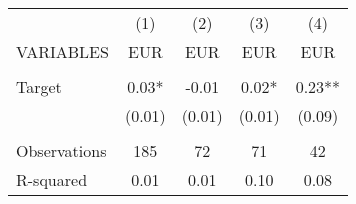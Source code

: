 \begin{tabular}{lcccc} \hline
 & (1) & (2) & (3) & (4) \\
VARIABLES & EUR & EUR & EUR & EUR \\ \hline
 &  &  &  &  \\
Target & 0.03* & -0.01 & 0.02* & 0.23** \\
 & (0.01) & (0.01) & (0.01) & (0.09) \\
 &  &  &  &  \\
Observations & 185 & 72 & 71 & 42 \\
 R-squared & 0.01 & 0.01 & 0.10 & 0.08 \\ \hline
\end{tabular}
